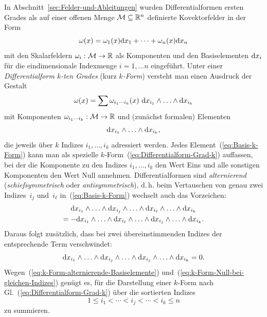In Abschnitt~\ref{sec:Felder-und-Ableitungen} wurden Differentialformen
ersten Grades als auf einer offenen Menge $\mathcal{M}\subseteq{\mathbb{R}}^{n}$
definierte Kovektorfelder in der Form 
\[
\omega(x)=\omega_{1}(x){\mathrm{d}} x_{1}+\cdots+\omega_{n}(x){\mathrm{d}} x_{n}
\]
mit den Skalarfeldern $\omega_{i}:\mathcal{M}\to{\mathbb{R}}$ als Komponenten
und den Basiselementen ${\mathrm{d}} x_{i}$ für die eindimensionale Indexmenge
$i=1,\ldots n$ eingeführt. Unter einer \emph{Differentialform $k$-ten
Grades} (kurz \emph{$k$-Form})
versteht man einen Ausdruck der Gestalt 
\begin{equation}
\omega(x)=\sum\omega_{i_{1}\cdots i_{k}}(x)\ {\mathrm{d}} x_{i_{1}}\wedge\ldots\wedge{\mathrm{d}} x_{i_{k}}\label{eq:Differentialform-Grad-k}
\end{equation}
mit Komponenten $\omega_{i_{1}\cdots i_{k}}:\mathcal{M}\to{\mathbb{R}}$ und
(zunächst formalen) Elementen
\begin{equation}
{\mathrm{d}} x_{i_{1}}\wedge\ldots\wedge{\mathrm{d}} x_{i_{k}},\label{eq:Basis-k-Form}
\end{equation}
die jeweils über $k$ Indizes $i_{1},\ldots,i_{k}$ adressiert werden.
Jedes Element~(\ref{eq:Basis-k-Form}) kann man als spezielle $k$-Form~(\ref{eq:Differentialform-Grad-k})
auffassen, bei der die Komponente zu den Indizes $i_{1},\ldots,i_{k}$
den Wert Eins und alle sonstigen Komponenten den Wert Null annehmen.
Differentialformen sind \emph{alternierend} (\emph{schiefsymmetrisch}
oder \emph{antisymmetrisch}), d.\,h. beim Vertauschen von genau zwei
Indizes~$i_{j}$ und~$i_{\ell}$ in~(\ref{eq:Basis-k-Form}) wechselt
auch das Vorzeichen: 
\begin{gather}
{\mathrm{d}} x_{i_{1}}\wedge\ldots\wedge{\mathrm{d}} x_{i_{j}}\wedge\ldots\wedge{\mathrm{d}} x_{i_{\ell}}\wedge\ldots\wedge{\mathrm{d}} x_{i_{k}}\nonumber \\
=-{\mathrm{d}} x_{i_{1}}\wedge\ldots\wedge{\mathrm{d}} x_{i_{\ell}}\wedge\ldots\wedge{\mathrm{d}} x_{i_{j}}\wedge\ldots\wedge{\mathrm{d}} x_{i_{k}}.\label{eq:k-Form-alternierende-Basiselemente}
\end{gather}
Daraus folgt zusätzlich, dass bei zwei übereinstimmenden Indizes der
entsprechende Term verschwindet: 
\begin{equation}
{\mathrm{d}} x_{i_{1}}\wedge\ldots\wedge{\mathrm{d}} x_{i_{j}}\wedge\ldots\wedge{\mathrm{d}} x_{i_{j}}\wedge\ldots\wedge{\mathrm{d}} x_{i_{k}}=0.\label{eq:k-Form-Null-bei-gleichen-Indizes}
\end{equation}
Wegen~(\ref{eq:k-Form-alternierende-Basiselemente}) und~(\ref{eq:k-Form-Null-bei-gleichen-Indizes})
genügt es, für die Darstellung einer $k$-Form nach Gl.~(\ref{eq:Differentialform-Grad-k})
über die sortierten Indizes 
\begin{equation}
1\leq i_{1}<\cdots<i_{j}<\cdots<i_{k}\leq n\label{eq:k-Form-Numerierung-sortiert}
\end{equation}
zu summieren.

